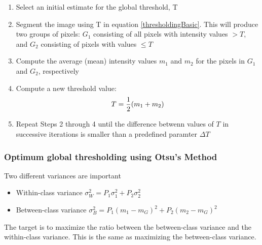 \begin{enumerate}
\item Select an initial estimate for the global threshold, T
\item Segment the image using T in equation \eqref{thresholdingBasic}. This will produce two groups of pixels: $G_1$ consisting of all pixels with intensity values $> T$, and $G_2$ consisting of pixels with values $\leq T$
\item Compute the average (mean) intensity values $m_1$ and $m_2$ for the pixels in $G_1$ and $G_2$, respectively
\item Compute a new threshold value: \begin{equation}
T=\frac{1}{2}(m_1+m_2)\notag
\end{equation} 
\item Repeat Steps 2 through 4 until the difference betwenn values of $T$ in successive iterations is smaller than a predefined paramter $\Delta T$
\end{enumerate}


\subsubsection{Optimum global thresholding using Otsu’s Method}
Two different variances are important
\begin{itemize}
\item Within-class variance $\sigma_W^2 = P_1\sigma_1^2+P_2\sigma_2^2$
\item Between-class variance $\sigma_B^2 = P_1(m_1-m_G)^2+P_2(m_2-m_G)^2$
\end{itemize}

The target is to maximize the ratio between the between-class variance and the within-class variance.
This is the same as maximizing the between-class variance.

